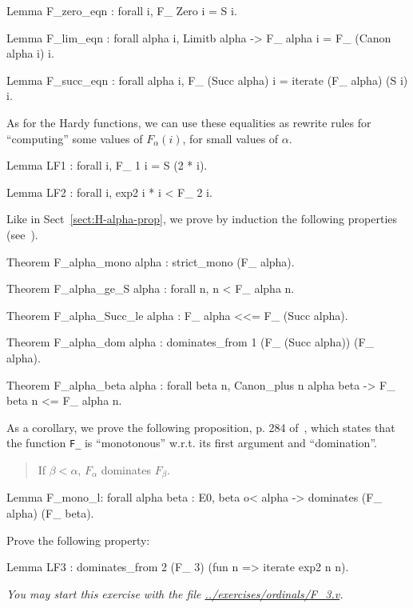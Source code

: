\begin{Coqsrc}
Lemma F_zero_eqn : forall i, F_ Zero i = S i.

Lemma F_lim_eqn : forall alpha i,  Limitb alpha ->
                               F_ alpha i = F_ (Canon alpha i) i.

Lemma F_succ_eqn : forall alpha i,
    F_ (Succ alpha) i = iterate (F_ alpha) (S i) i.
\end{Coqsrc}

As for the Hardy functions, we can use these equalities as rewrite rules for
``computing'' some values of $F_\alpha(i)$, for small values of $\alpha$.

\begin{Coqsrc}
Lemma LF1 : forall i,  F_ 1 i = S (2 * i).

Lemma LF2 : forall i, exp2 i * i < F_ 2 i.
\end{Coqsrc}


Like in Sect~\ref{sect:H-alpha-prop}, we prove by induction the following properties (see~\cite{KS81}). 

\begin{Coqsrc}
Theorem F_alpha_mono alpha : strict_mono (F_ alpha).
 
Theorem F_alpha_ge_S alpha : forall n, n < F_ alpha n.

Theorem F_alpha_Succ_le alpha : F_ alpha <<= F_ (Succ alpha).

Theorem F_alpha_dom alpha : 
     dominates_from 1 (F_ (Succ alpha)) (F_ alpha).

Theorem F_alpha_beta alpha : 
   forall beta n, Canon_plus n alpha beta -> 
                                        F_ beta n <= F_ alpha n.
\end{Coqsrc}

As a corollary, we prove the following proposition, p. 284 of~\cite{KS81}, which states that the function \texttt{F\_} is ``monotonous'' w.r.t. its first argument and ``domination''.


\begin{quote}
  If $\beta<\alpha$, $F_\alpha$ dominates $F_\beta$.
\end{quote}

\begin{Coqsrc}
Lemma F_mono_l: forall alpha beta : E0, 
   beta o< alpha -> dominates (F_ alpha) (F_ beta).
\end{Coqsrc}


\begin{exercise}
Prove the following property:

\begin{Coqsrc}
Lemma LF3 : dominates_from  2 (F_ 3) (fun  n => iterate exp2 n n).
\end{Coqsrc}

\emph{You may start this exercise with the file
\url{../exercises/ordinals/F_3.v}.}
\end{exercise}


